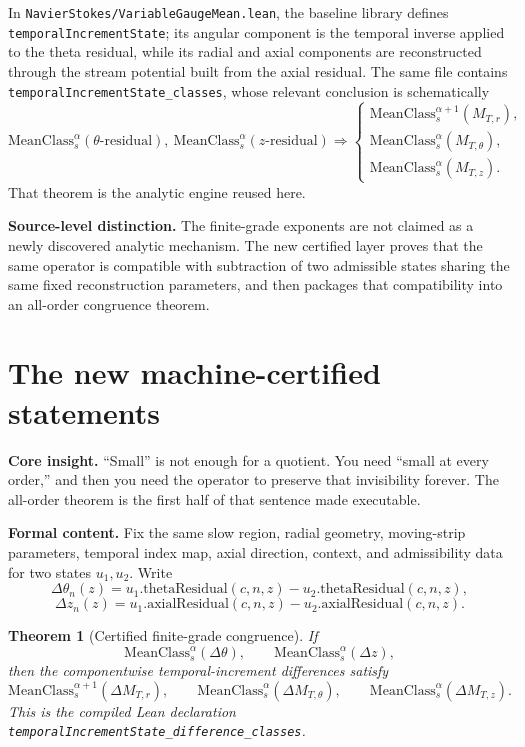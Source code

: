 \documentclass[11pt]{article}
\theoremstyle{highend}
\newtheorem{theorem}{Theorem}[section]
\theoremstyle{definition}
\newcommand{\MeanClass}{\mathrm{MeanClass}}
\begin{document}
In \texttt{NavierStokes/VariableGaugeMean.lean}, the baseline library defines \texttt{temporalIncrementState}; its angular component is the temporal inverse applied to the theta residual, while its radial and axial components are reconstructed through the stream potential built from the axial residual. The same file contains
\texttt{temporalIncrementState\_classes}, whose relevant conclusion is schematically
\[
\MeanClass_s^\alpha(\theta\text{-residual}),\ 
\MeanClass_s^\alpha(z\text{-residual})
\Longrightarrow
\begin{cases}
\MeanClass_s^{\alpha+1}(M_{T,r}),\\
\MeanClass_s^{\alpha}(M_{T,\theta}),\\
\MeanClass_s^{\alpha}(M_{T,z}).
\end{cases}
\]
That theorem is the analytic engine reused here.

\begin{formalbox}
\textbf{Source-level distinction.} The finite-grade exponents are not claimed as a newly discovered analytic mechanism. The new certified layer proves that the same operator is compatible with subtraction of two admissible states sharing the same fixed reconstruction parameters, and then packages that compatibility into an all-order congruence theorem.
\end{formalbox}

\section{The new machine-certified statements}
\begin{eurekabox}
\textbf{Core insight.} ``Small'' is not enough for a quotient. You need ``small at every order,'' and then you need the operator to preserve that invisibility forever. The all-order theorem is the first half of that sentence made executable.
\end{eurekabox}
\noindent\textbf{Formal content.}
Fix the same slow region, radial geometry, moving-strip parameters, temporal index map, axial direction, context, and admissibility data for two states \(u_1,u_2\). Write
\[
\Delta\theta_n(z)=u_1.\mathrm{thetaResidual}(c,n,z)-u_2.\mathrm{thetaResidual}(c,n,z),
\]
\[
\Delta z_n(z)=u_1.\mathrm{axialResidual}(c,n,z)-u_2.\mathrm{axialResidual}(c,n,z).
\]

\begin{theorem}[Certified finite-grade congruence]\label{thm:finite}
If
\[
\MeanClass_s^\alpha(\Delta\theta),\qquad \MeanClass_s^\alpha(\Delta z),
\]
then the componentwise temporal-increment differences satisfy
\[
\MeanClass_s^{\alpha+1}(\Delta M_{T,r}),\qquad
\MeanClass_s^\alpha(\Delta M_{T,\theta}),\qquad
\MeanClass_s^\alpha(\Delta M_{T,z}).
\]
This is the compiled Lean declaration
\texttt{temporalIncrementState\_difference\_classes}.
\end{theorem}
\end{document}
